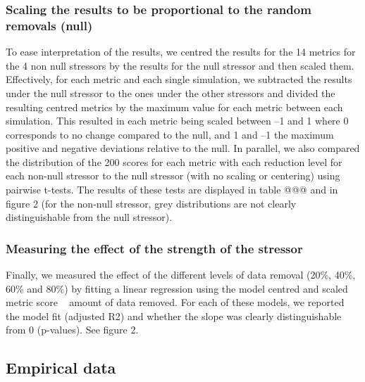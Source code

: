 \documentclass[12pt,letterpaper]{article}
\begin{document}
\subsubsection{Scaling the results to be proportional to the random removals (null)}

To ease interpretation of the results, we centred the results for the 14 metrics for the 4 non null stressors by the results for the null stressor and then scaled them.
Effectively, for each metric and each single simulation, we subtracted the results under the null stressor to the ones under the other stressors and divided the resulting centred metrics by the maximum value for each metric between each simulation.
This resulted in each metric being scaled between –1 and 1 where 0 corresponds to no change compared to the null, and 1 and –1 the maximum positive and negative deviations relative to the null.
In parallel, we also compared the distribution of the 200 scores for each metric with each reduction level for each non-null stressor to the null stressor (with no scaling or centering) using pairwise t-tests.
The results of these tests are displayed in table @@@ and in figure 2 (for the non-null stressor, grey distributions are not clearly distinguishable from the null stressor).

\subsubsection{Measuring the effect of the strength of the stressor}

Finally, we measured the effect of the different levels of data removal (20\%, 40\%, 60\% and 80\%) by fitting a linear regression using the model centred and scaled metric score ~ amount of data removed.
For each of these models, we reported the model fit (adjusted R2) and whether the slope was clearly distinguishable from 0 (p-values). See figure 2.

\subsection{Empirical data}
\end{document}
